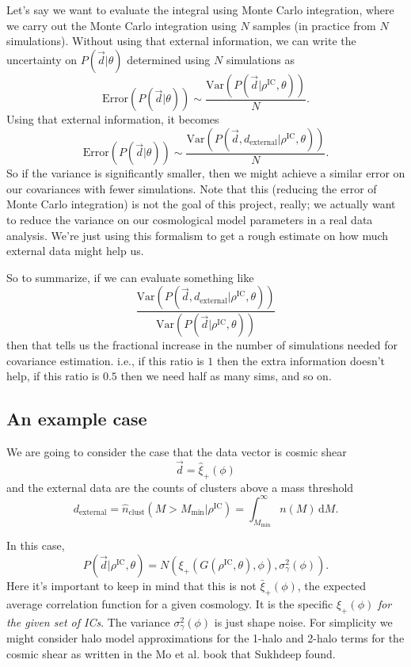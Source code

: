 \documentclass[preprint]{aastex}
\newcommand{\beq}{\begin{equation}}
\newcommand{\eeq}{\end{equation}}
\begin{document}
Let's say we want to evaluate the integral using Monte Carlo integration, where we carry out the
Monte Carlo integration using $N$ samples (in practice from $N$ simulations).  Without using that
external information, we can write the uncertainty on $P(\vec{d}|\theta)$ determined using $N$
simulations as
\beq
\text{Error}(P(\vec{d}|\theta)) \sim \frac{\text{Var}(P(\vec{d}|\rho^\text{IC},\theta))}{N}.
\eeq
Using that external information, it becomes
\beq
\text{Error}(P(\vec{d}|\theta)) \sim \frac{\text{Var}(P(\vec{d},d_\text{external}|\rho^\text{IC},\theta))}{N}.
\eeq
So if the variance is significantly smaller, then we might achieve a similar error on our
covariances with fewer simulations.  Note that this (reducing the error of Monte Carlo integration)
is not the goal of this project, really; we actually want to reduce the variance on our cosmological
model parameters in a real data analysis.  We're just using this formalism to get a rough estimate
on how much external data might help us.

So to summarize, if we can evaluate something like
\beq
\frac{\text{Var}(P(\vec{d},d_\text{external}|\rho^\text{IC},\theta))}{\text{Var}(P(\vec{d}|\rho^\text{IC},\theta))}
\eeq
then that tells us the fractional increase in the number of simulations needed for covariance
estimation.  i.e., if this ratio is $1$ then the extra information doesn't help, if this ratio is
$0.5$ then we need half as many sims, and so on.

\subsection{An example case}

We are going to consider the case that the data vector is cosmic shear
\beq
\vec{d} = \hat{\xi}_+(\phi)
\eeq
and the external data are the counts of clusters above a mass threshold
\beq
d_\text{external} = \hat{n}_\text{clust}(M>M_\text{min} | \rho^\text{IC}) =
\int_{M_\text{min}}^{\infty} n(M)\,\mathrm{d}M.
\eeq

In this case,
\beq
P(\vec{d}|\rho^\text{IC},\theta) = N(\xi_+(G(\rho^\text{IC},\theta), \phi), \sigma^2_\gamma(\phi)).
\eeq
Here it's important to keep in mind that this is not $\bar{\xi}_+(\phi)$, the expected average correlation
function for a given cosmology.  It is the specific $\xi_+(\phi)$ {\em for the given set of ICs}. The
variance $\sigma^2_\gamma(\phi)$ is just shape noise.  For simplicity we might consider halo model
approximations for the 1-halo and 2-halo terms for the cosmic shear as written in the Mo et al. book
that Sukhdeep found.  
\end{document}
